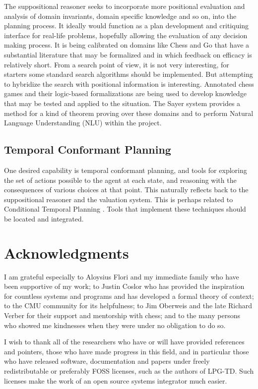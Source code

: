 \documentclass[letterpaper]{article}
\begin{document}
\noindent The suppositional reasoner seeks to incorporate more
positional evaluation and analysis of domain invariants, domain
specific knowledge and so on, into the planning process.  It ideally
would function as a plan development and critiquing interface for
real-life problems, hopefully allowing the evaluation of any decision
making process.  It is being calibrated on domains like Chess and Go
that have a substantial literature that may be formalized and in which
feedback on efficacy is relatively short.  From a search point of
view, it is not very interesting, for starters some standard search
algorithms should be implemented.  But attempting to hybridize the
search with positional information is interesting.  Annotated chess
games and their logic-based formalizations are being used to develop
knowledge that may be tested and applied to the situation.  The Sayer
system provides a method for a kind of theorem proving over these
domains and to perform Natural Language Understanding (NLU) within the
project.


\subsection{Temporal Conformant Planning}

One desired capability is temporal conformant planning, and tools for
exploring the set of actions possible to the agent at each state, and
reasoning with the consequences of various choices at that point.
This naturally reflects back to the suppositional reasoner and the
valuation system.  This is perhaps related to Conditional Temporal
Planning \cite{Tsamardinos03ctp:a}.  Tools that implement these
techniques should be located and integrated.


\section{Acknowledgments}

\noindent I am grateful especially to Aloysius Flori and my immediate
family who have been supportive of my work; to Justin Coslor who has
provided the inspiration for countless systems and programs and has
developed a formal theory of context; to the CMU community for its
helpfulness; to Jim Oberweis and the late Richard Verber for their
support and mentorship with chess; and to the many persons who showed
me kindnesses when they were under no obligation to do so.

I wish to thank all of the researchers who have or will have provided
references and pointers, those who have made progress in this field,
and in particular those who have released software, documentation and
papers under freely redistributable or preferably FOSS licenses, such
as the authors of LPG-TD. Such licenses make the work of an open
source systems integrator much easier.

 
\end{document}
